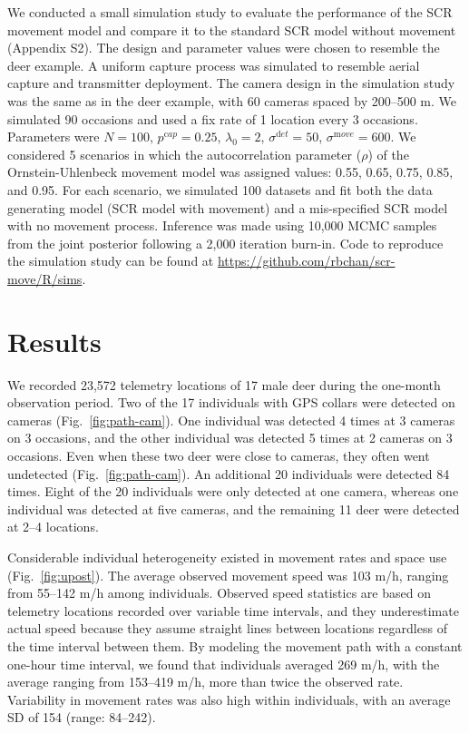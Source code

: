 \documentclass[12pt]{article}
\begin{document}
We conducted a small simulation study to evaluate the performance of the
SCR movement model and compare it to the standard SCR model without
movement (Appendix S2). The design and parameter values were chosen to
resemble the deer example. A uniform capture process was
simulated to resemble aerial capture and transmitter
deployment. The camera design in the simulation study was the same as
in the deer example, with 60 cameras spaced by 200--500 m. We simulated
90 occasions and used a fix rate of 1 location every 3
occasions. Parameters were $N=100$,
$p^{\mathrm cap}=0.25$, $\lambda_0=2$, $\sigma^{\mathrm det}=50$,
$\sigma^{\mathrm move}=600$. We 
considered 5 scenarios in which the autocorrelation parameter ($\rho$)
of the Ornstein-Uhlenbeck movement model was assigned values: 0.55,
0.65, 0.75, 0.85, and 0.95. For each scenario, we simulated 100
datasets and fit both the data generating model (SCR model with
movement) and a mis-specified SCR model with no movement
process. Inference was made using 10,000 MCMC samples from the joint
posterior following a 2,000 iteration burn-in. Code to reproduce the
simulation study can be found at
\url{https://github.com/rbchan/scr-move/R/sims}. 


\section{Results}

We recorded 23,572 telemetry locations of 17 male deer during the
one-month observation period. Two of the 17 individuals with GPS
collars were detected on cameras (Fig.~\ref{fig:path-cam}). One
individual was detected 4 times at 3 cameras on 3 occasions, and the
other individual was detected 5 times at 2 cameras on 3
occasions. Even when these two deer were close to cameras, they often
went undetected (Fig.~\ref{fig:path-cam}). An additional 20
individuals were detected 84 times. Eight 
of the 20 individuals were only detected at one camera, whereas one
individual was detected at five cameras, and the remaining 11 deer
were detected at 2--4 locations.

Considerable individual heterogeneity existed in movement rates and
space use (Fig.~\ref{fig:upost}).
The average observed movement speed was 103 m/h,
ranging from 55--142 m/h among individuals.
Observed speed statistics are based on telemetry locations
recorded over variable time intervals, and they underestimate actual
speed because they assume straight lines between locations regardless
of the time interval between them. By modeling the movement path with
a constant one-hour time interval, we found that individuals averaged
269 m/h, with the average ranging from 153--419 m/h, more than twice
the observed rate. Variability in movement rates was also high within
individuals, with an average SD of 154 (range: 84--242).
\end{document}
